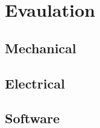 
\chapter{Evaulation}\label{eval}



\section{Mechanical}\label{eval/mech}


\section{Electrical}\label{eval/elec}


\section{Software}\label{eval/soft}
